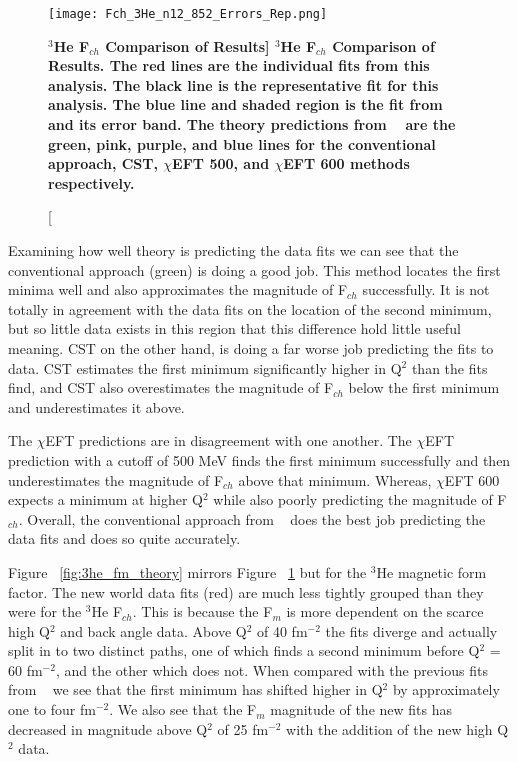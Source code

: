 \begin{figure}[!ht]
	\begin{center}
	\texttt{[image: Fch\_3He\_n12\_852\_Errors\_Rep.png]}
	\end{center}
	\caption[\bf{$^3$He F$_{ch}$ Comparison of Results}]{
	{\bf{$^3$He F$_{ch}$ Comparison of Results.}} The red lines are the individual fits from this analysis. The black line is the representative fit for this analysis. The blue line and shaded region is the fit from ~\cite{Article:Amroun} and its error band. The theory predictions from ~\cite{Article:Marcucci} are the green, pink, purple, and blue lines for the conventional approach, CST, $\chi$EFT 500, and $\chi$EFT 600 methods respectively.}
	\label{fig:3he_fch_theory}
\end{figure}
	
Examining how well theory is predicting the data fits we can see that the conventional approach (green) is doing a good job. This method locates the first minima well and also approximates the magnitude of F$_{ch}$ successfully. It is not totally in agreement with the data fits on the location of the second minimum, but so little data exists in this region that this difference hold little useful meaning. CST on the other hand, is doing a far worse job predicting the fits to data. CST estimates the first minimum significantly higher in Q$^2$ than the fits find, and CST also overestimates the magnitude of F$_{ch}$ below the first minimum and underestimates it above. 

The $\chi$EFT predictions are in disagreement with one another. The $\chi$EFT prediction with a cutoff of 500 MeV finds the first minimum successfully and then underestimates the magnitude of F$_{ch}$ above that minimum. Whereas, $\chi$EFT 600 expects a minimum at higher Q$^2$ while also poorly predicting the magnitude of F$_{ch}$. Overall, the conventional approach from ~\cite{Article:Marcucci} does the best job predicting the data fits and does so quite accurately. 

Figure ~\ref{fig:3he_fm_theory} mirrors Figure ~\ref{fig:3he_fch_theory} but for the $^3$He magnetic form factor. The new world data fits (red) are much less tightly grouped than they were for the $^3$He F$_{ch}$. This is because the F$_{m}$ is more dependent on the scarce high Q$^2$ and back angle data. Above Q$^2$ of 40 fm$^{-2}$ the fits diverge and actually split in to two distinct paths, one of which finds a second minimum before Q$^2$ = 60 fm$^{-2}$, and the other which does not. When compared with the previous fits from ~\cite{Article:Amroun} we see that the first minimum has shifted higher in Q$^2$ by approximately one to four fm$^{-2}$. We also see that the F$_m$ magnitude of the new fits has decreased in magnitude above Q$^2$ of 25 fm$^{-2}$ with the addition of the new high Q$^2$ data.


